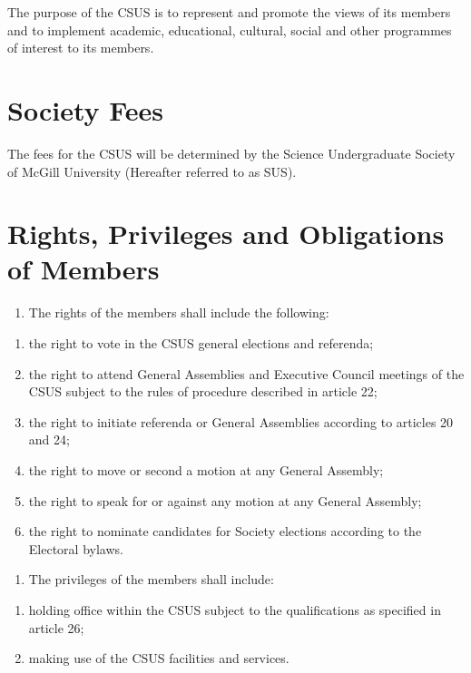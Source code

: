 The purpose of the CSUS is to represent and promote the views of its
members and to implement academic, educational, cultural, social and
other programmes of interest to its members.

\section{Society Fees}\label{society-fees}

The fees for the CSUS will be determined by the Science Undergraduate
Society of McGill University (Hereafter referred to as SUS).

\section{Rights, Privileges and Obligations of
Members}\label{rights-privileges-and-obligations-of-members}

\begin{enumerate}
\def\labelenumi{\arabic{enumi}.}
\tightlist
\item
  The rights of the members shall include the following:
\end{enumerate}

\begin{enumerate}
\def\labelenumi{(\alph{enumi})}
\tightlist
\item
  the right to vote in the CSUS general elections and referenda;
\item
  the right to attend General Assemblies and Executive Council meetings
  of the CSUS subject to the rules of procedure described in article 22;
\item
  the right to initiate referenda or General Assemblies according to
  articles 20 and 24;
\item
  the right to move or second a motion at any General Assembly;
\item
  the right to speak for or against any motion at any General Assembly;
\item
  the right to nominate candidates for Society elections according to
  the Electoral bylaws.
\end{enumerate}

\begin{enumerate}
\def\labelenumi{\arabic{enumi}.}
\setcounter{enumi}{1}
\tightlist
\item
  The privileges of the members shall include:
\end{enumerate}

\begin{enumerate}
\def\labelenumi{(\alph{enumi})}
\tightlist
\item
  holding office within the CSUS subject to the qualifications as
  specified in article 26;
\item
  making use of the CSUS facilities and services.
\end{enumerate}

